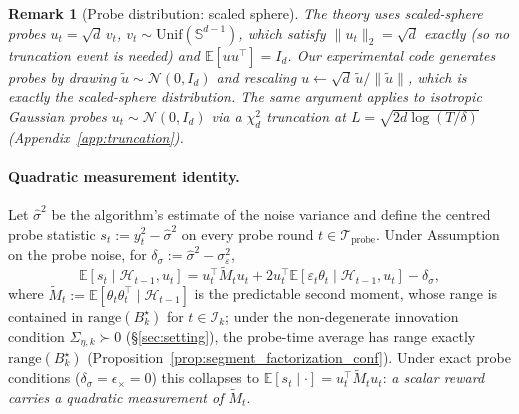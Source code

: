 \documentclass{article}
\newcommand{\E}{\mathbb{E}}
\newcommand{\cH}{\mathcal{H}}
\newcommand{\cI}{\mathcal{I}}
\newcommand{\cTprobe}{\mathcal{T}_{\mathrm{probe}}}
\newcommand{\range}{\mathrm{range}}
\newtheorem{remark}{Remark}
\begin{document}
\begin{remark}[Probe distribution: scaled sphere]
\label{rem:subgauss_probe}
The theory uses scaled-sphere probes
$u_t = \sqrt d\,v_t$, $v_t\sim\mathrm{Unif}(\mathbb S^{d-1})$, which
satisfy $\|u_t\|_2 = \sqrt d$ \emph{exactly} (so no truncation event
is needed) and $\E[uu^\top] = I_d$. Our experimental code generates
probes by drawing $\tilde u\sim\mathcal N(0,I_d)$ and rescaling
$u\leftarrow \sqrt d\,\tilde u/\|\tilde u\|$, which is exactly the
scaled-sphere distribution. The same argument applies to isotropic
Gaussian probes $u_t\sim\mathcal N(0,I_d)$ via a $\chi^2_d$
truncation at $L=\sqrt{2d\log(T/\delta)}$
(Appendix~\ref{app:truncation}).
\end{remark}

\paragraph{Quadratic measurement identity.}
Let $\hat\sigma^2$ be the algorithm's estimate of the noise variance
and define the centred probe statistic $s_t := y_t^2 - \hat\sigma^2$
on every probe round $t\in\cTprobe$. Under Assumption on the probe
noise, for $\delta_\sigma := \hat\sigma^2-\sigma_\varepsilon^2$,
\begin{equation}
\E[s_t \mid \cH_{t-1},u_t]
  = u_t^\top \widetilde{M}_t u_t + 2 u_t^\top
    \E[\varepsilon_t\theta_t\mid\cH_{t-1},u_t] - \delta_\sigma,
\label{eq:quad_identity}
\end{equation}
where $\widetilde{M}_t := \E[\theta_t\theta_t^\top\mid \cH_{t-1}]$
is the predictable second moment, whose range is contained in
$\range(B_k^\star)$ for $t\in\cI_k$; under the non-degenerate
innovation condition $\Sigma_{\eta,k}\succ 0$ (\S\ref{sec:setting}),
the probe-time average has range exactly $\range(B_k^\star)$
(Proposition~\ref{prop:segment_factorization_conf}). Under exact probe conditions
($\delta_\sigma = \epsilon_\times = 0$) this collapses to
$\E[s_t\mid\cdot] = u_t^\top\widetilde M_t u_t$: \emph{a scalar reward
carries a quadratic measurement of $\widetilde M_t$}.
\end{document}
